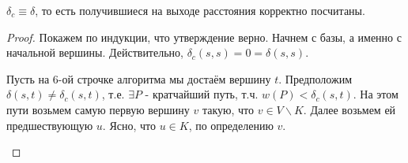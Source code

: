 \Th $\delta_c \equiv \delta$, то есть получившиеся на выходе расстояния корректно посчитаны.
\begin{proof}

Покажем по индукции, что утверждение верно. Начнем с базы, а именно с начальной вершины. Действительно, $\delta_c(s, s) = 0 = \delta(s, s)$.

Пусть на 6-ой строчке алгоритма мы достаём вершину $t$. Предположим $\delta(s, t) \neq \delta_c(s, t)$, т.е. $\exists P$ - кратчайший путь, т.ч. $w(P) < \delta_c(s, t)$. На этом пути возьмем самую первую вершину $v$ такую, что $v \in V \backslash K$. Далее возьмем ей предшествующую $u$. Ясно, что $u \in K$, по определению $v$.

\begin{figure}[H]
\centering
{}


\end{figure}
\end{proof}
